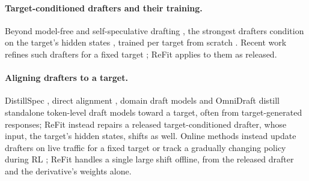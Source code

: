 \documentclass[11pt]{article}
\newcommand{\refit}{ReFit}
\begin{document}
\paragraph{Target-conditioned drafters and their training.}
Beyond model-free and self-speculative drafting \citep{fu2024lookahead,he2024rest,saxena2023pld,oliaro2024suffix,zhang2024draftverify,miao2024specinfer,chen2024sequoia,xia2024survey}, the strongest drafters condition on the target's hidden states \citep{cai2024medusa,ankner2024hydra,li2024eagle,li2024eagle2,li2025eagle3,zhang2025hass,jiang2026hspec,chen2026dflash}, trained per target from scratch \citep{li2026specforge,redhat2025speculators}.
Recent work refines such drafters for a fixed target \citep{lei2026draftopd,eldenk2026attentiondrift,eagle31,zhao2025frspec,goel2025vocabtrim}; \refit{} applies to them as released.

\paragraph{Aligning drafters to a target.}
DistillSpec \citep{zhou2024distillspec}, direct alignment \citep{goel2024direct}, domain draft models \citep{hong2025domain} and OmniDraft \citep{ramakrishnan2025omnidraft} distill standalone token-level draft models toward a target, often from target-generated responses; \refit{} instead repairs a released target-conditioned drafter, whose input, the target's hidden states, shifts as well.
Online methods instead update drafters on live traffic for a fixed target \citep{liu2024online,zhang2026evospec,wang2026aurora} or track a gradually changing policy during RL \citep{chen2025respec,zhang2025fastgrpo}; \refit{} handles a single large shift offline, from the released drafter and the derivative's weights alone.
\end{document}
